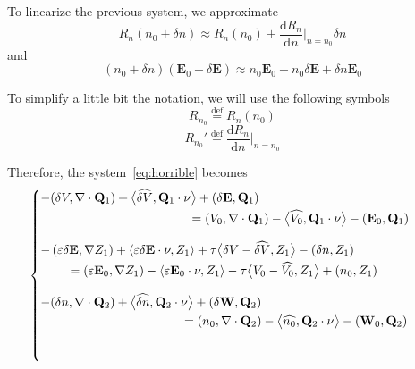 \documentclass[a4paper,12pt]{article}
\newcommand{\Def}{\stackrel{\mathrm{def}}{=}}
\newcommand{\diver}[1]{\ensuremath{\nabla \cdot #1}}
\begin{document}
To linearize the previous system, we approximate
\[ R_n(n_{0} + \delta n) \approx R_n(n_0) + \frac{\mathrm{d}R_n}{\mathrm{d}n}|_{n = 
n_0}\delta{}n \]
and
\[ \left(n_{0} + \delta n \right) \left(\mathbf{E}_{0} + \delta \mathbf{E}\right) \approx n_0 
\mathbf{E}_0 + n_0 \delta{}\mathbf{E}  + \delta{}n \mathbf{E}_0 \]

To simplify a little bit the notation, we will use the following symbols
\[
 R_{n_0} \Def R_n(n_0)
\]
\[
 R_{n_0}' \Def \frac{\mathrm{d}R_n}{\mathrm{d}n}|_{n = n_0}
\]

Therefore, the system~\ref{eq:horrible} becomes
\begin{equation*}
 \begin{cases}
  \begin{aligned}
   -(\delta V, \diver{\mathbf{Q}_{1}}) + \big<\widehat{\delta V}, \mathbf{Q}_{1} \cdot \nu \big> 
          + \left(\delta \mathbf{E}, \mathbf{Q}_{1} \right) \\
      & \hspace{-56.6pt} = (V_0, \diver{\mathbf{Q}_{1}}) - \big<\widehat{V_{0}}, \mathbf{Q}_{1} 
          \cdot \nu \big> - \left(\mathbf{E}_{0}, \mathbf{Q}_{1} \right)
  \end{aligned} \\[20pt]
  \begin{aligned}
  - \left(\varepsilon\delta \mathbf{E}, \nabla Z_{1}\right) + \left<\varepsilon  \delta \mathbf{E} 
          \cdot \nu, Z_{1}\right> + \tau \big< \delta V - \widehat{\delta V}, Z_{1} \big> -
          ( \delta n , Z_{1}) \\
      & \hspace{-230pt}  = \left(\varepsilon \mathbf{E}_{0}, \nabla Z_{1}\right) 
          - \left<\varepsilon \mathbf{E}_{0} \cdot \nu, Z_{1}\right> - \tau \big< V_{0}
          - \widehat{V_{0}}, Z_{1} \big> + (n_{0}, Z_{1})
  \end{aligned} \\[20pt]
    \begin{aligned}
  -(\delta n, \diver{\mathbf{Q}_{2}}) + \big<\widehat{\delta n}, \mathbf{Q}_{2} \cdot \nu \big> 
          + \left(\delta \mathbf{W}, \mathbf{Q}_{2} \right) \\
      & \hspace{-64.5pt} = (n_0, \diver{\mathbf{Q}_{2}}) - \big<\widehat{n_{0}}, \mathbf{Q}_{2} 
          \cdot \nu \big> - \left(\mathbf{W}_{0}, \mathbf{Q}_{2} \right)
  \end{aligned} \\[20pt]
  \begin{aligned}

\end{aligned}
\end{cases}
\end{equation*}
\end{document}

